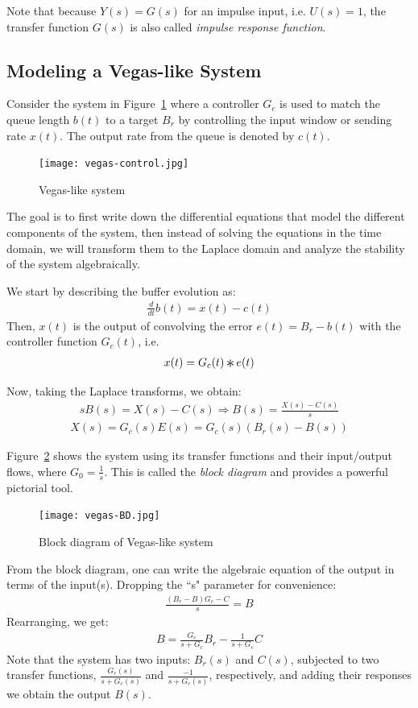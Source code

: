 \documentclass{article}
\newcommand{\Conv}{\mathop{\scalebox{1.5}{\raisebox{-0.2ex}{$\ast$}}}}%
\begin{document}
Note that because $Y(s) =  G(s)$ for an impulse input, i.e. $U(s)=1$,
the transfer function $G(s)$ is also called {\em impulse response function}.

\subsection{Modeling a Vegas-like System}

Consider the system in Figure~\ref{fig:vegas-control} where a controller $G_c$ is used to match
the queue length $b(t)$ to a target $B_r$ by controlling the input window or sending rate $x(t)$.
The output rate from the queue is denoted by $c(t)$.
\begin{figure}[htbp]
   \centering
   \texttt{[image: vegas-control.jpg]} %
   \caption{Vegas-like system}
   \label{fig:vegas-control}
\end{figure}
The goal is to first write down the differential equations that model the different components of the system,
then instead of solving the equations in the time domain, we will transform them to the Laplace domain and
analyze the stability of the system algebraically.

We start by describing the buffer evolution as:
\begin{eqnarray*}
\frac{d}{dt} b(t) = x(t) - c(t)
\end{eqnarray*}
Then, $x(t)$ is the output of convolving the error $e(t) = B_r - b(t)$ with the controller function $G_c(t)$,
 i.e. 
\begin{eqnarray*}
x(t) = G_c(t) \Conv e(t)
\end{eqnarray*}

Now, taking the Laplace transforms, we obtain:
\begin{eqnarray*}
s B(s) = X(s) - C(s)  \Rightarrow  B(s) = \frac{X(s) - C(s)}{s}
\end{eqnarray*}
\begin{eqnarray*}
X(s) = G_c(s) E(s) = G_c(s) (B_r(s) - B(s))
\end{eqnarray*}

Figure~\ref{fig:vegas-BD} shows the system using its transfer functions and their input/output flows,
where $G_0 = \frac{1}{s}$.
This is called the {\em block diagram} and provides a powerful pictorial tool.
\begin{figure}[htbp]
   \centering
   \texttt{[image: vegas-BD.jpg]} %
   \caption{Block diagram of Vegas-like system}
   \label{fig:vegas-BD}
\end{figure} 
From the block diagram, one can write the algebraic equation of the output in terms of the input(s).
Dropping the ``s" parameter for convenience:
\begin{eqnarray*}
\frac{(B_r - B) G_c - C}{s} = B
\end{eqnarray*}
Rearranging, we get:
\begin{eqnarray}
B = \frac{G_c}{s + G_c} B_r - \frac{1}{s + G_c} C
\label{eqn:vegas-TF}
\end{eqnarray}
Note that the system has two inputs: $B_r(s)$ and $C(s)$, subjected to two transfer functions,
$\frac{G_c(s)}{s + G_c(s)}$ and $\frac{-1}{s + G_c(s)}$, respectively, and 
adding their responses we obtain the output $B(s)$.
\end{document}
